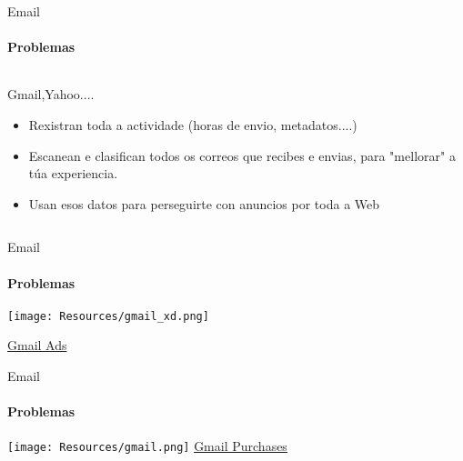 \documentclass{beamer}
\begin{document}

\begin{frame}{Email}
  \framesubtitle{Problemas}

  \begin{columns}

    \begin{column}{0.5\textwidth}
      \begin{block}{Gmail,Yahoo....}
        \begin{itemize}
          \item Rexistran toda a actividade (horas de envio, metadatos....)
          \item Escanean e clasifican todos os correos que recibes e envias, para "mellorar" a túa experiencia.
          \item Usan esos datos para perseguirte con anuncios por toda a Web
        \end{itemize}
      \end{block}

    \end{column}

  \end{columns}

\end{frame}



\begin{frame}{Email}
  \framesubtitle{Problemas}

  \texttt{[image: Resources/gmail\_xd.png]}

  \href{https://money.cnn.com/2017/06/23/technology/business/google-ad-scanning-email-stop/index.html}{Gmail Ads}

\end{frame}


\begin{frame}{Email}
  \framesubtitle{Problemas}

  \texttt{[image: Resources/gmail.png]}
  \href{https://www.wired.com/story/google-purchases-gmail-adobe-roundup/}{Gmail Purchases}

\end{frame}


\end{document}
